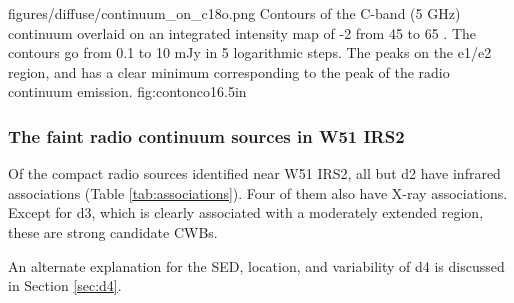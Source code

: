 \Figure
{figures/diffuse/continuum_on_c18o.png}
{Contours of the C-band (5 GHz) continuum overlaid on an integrated intensity
map of -2 from 45 to 65 \kms \citep{Parsons2012a}.  The contours
go from 0.1 to 10 mJy in 5 logarithmic steps.  The \ceighteeno peaks on the
e1/e2 region, and has a clear minimum corresponding to the peak of the radio
continuum emission.
}
{fig:contonco}{1}{6.5in}

\subsubsection{The faint radio continuum sources in W51 IRS2}

Of the compact radio sources identified near W51 IRS2, all but d2 have infrared
associations (Table \ref{tab:associations}).  Four of them also have X-ray
associations.  Except for d3, which is clearly associated with a moderately
extended \hii region, these are strong candidate CWBs.

An alternate explanation for the SED, location, and variability of d4 is
discussed in Section \ref{sec:d4}.



